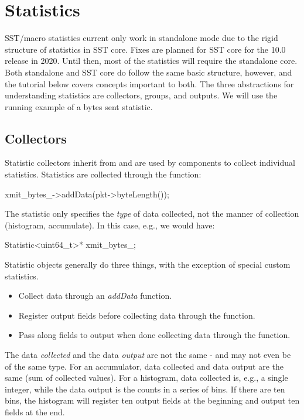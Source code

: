 
\section{Statistics}
SST/macro statistics current only work in standalone mode due to the rigid structure of statistics in SST core.
Fixes are planned for SST core for the 10.0 release in 2020.
Until then, most of the statistics will require the standalone core.
Both standalone and SST core do follow the same basic structure, however, and the tutorial below covers concepts important to both.
The three abstractions for understanding statistics are collectors, groups, and outputs.
We will use the running example of a bytes sent statistic.

\subsection{Collectors}
Statistic collectors inherit from  and are used by components to collect individual statistics.
Statistics are collected through the  function:

\begin{CppCode}
xmit_bytes_->addData(pkt->byteLength());
\end{CppCode}
The statistic only specifies the \emph{type} of data collected, not the manner of collection (histogram, accumulate).
In this case, e.g., we would have:

\begin{CppCode}
Statistic<uint64_t>* xmit_bytes_;
\end{CppCode}
Statistic objects generally do three things, with the exception of special custom statistics.

\begin{itemize}
\item Collect data through an \emph{addData} function.
\item Register output fields before collecting data through the  function.
\item Pass along fields to output when done collecting data through the  function.
\end{itemize}

The data \emph{collected} and the data \emph{output} are not the same - and may not even be of the same type.
For an accumulator, data collected and data output are the same (sum of collected values).
For a histogram, data collected is, e.g., a single integer, while the data output is the counts in a series of bins.
If there are ten bins, the histogram will register ten output fields at the beginning and output ten fields at the end.

